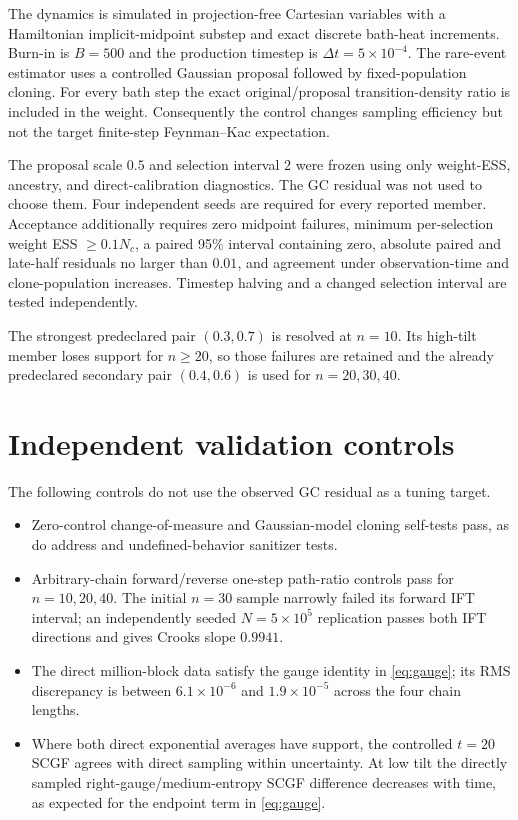\documentclass[11pt]{article}
\begin{document}
The dynamics is simulated in projection-free Cartesian variables with a
Hamiltonian implicit-midpoint substep and exact discrete bath-heat increments.
Burn-in is $B=500$ and the production timestep is $\Delta t=5\times10^{-4}$.
The rare-event estimator uses a controlled Gaussian proposal followed by
fixed-population cloning.  For every bath step the exact original/proposal
transition-density ratio is included in the weight.  Consequently the control
changes sampling efficiency but not the target finite-step Feynman--Kac
expectation.

The proposal scale $0.5$ and selection interval $2$ were frozen using only
weight-ESS, ancestry, and direct-calibration diagnostics.  The GC residual was
not used to choose them.  Four independent seeds are required for every
reported member.  Acceptance additionally requires zero midpoint failures,
minimum per-selection weight ESS $\ge0.1N_c$, a paired 95\% interval containing
zero, absolute paired and late-half residuals no larger than $0.01$, and
agreement under observation-time and clone-population increases.  Timestep
halving and a changed selection interval are tested independently.

The strongest predeclared pair $(0.3,0.7)$ is resolved at $n=10$.  Its
high-tilt member loses support for $n\ge20$, so those failures are retained and
the already predeclared secondary pair $(0.4,0.6)$ is used for
$n=20,30,40$.

\section{Independent validation controls}

The following controls do not use the observed GC residual as a tuning target.
\begin{itemize}
  \item Zero-control change-of-measure and Gaussian-model cloning self-tests
  pass, as do address and undefined-behavior sanitizer tests.
  \item Arbitrary-chain forward/reverse one-step path-ratio controls pass for
  $n=10,20,40$.  The initial $n=30$ sample narrowly failed its forward IFT
  interval; an independently seeded $N=5\times10^5$ replication passes both
  IFT directions and gives Crooks slope $0.9941$.
  \item The direct million-block data satisfy the gauge identity in
  \eqref{eq:gauge}; its RMS discrepancy is between $6.1\times10^{-6}$ and
  $1.9\times10^{-5}$ across the four chain lengths.
  \item Where both direct exponential averages have support, the controlled
  $t=20$ SCGF agrees with direct sampling within uncertainty.  At low tilt the
  directly sampled right-gauge/medium-entropy SCGF difference decreases with
  time, as expected for the endpoint term in \eqref{eq:gauge}.
\end{itemize}
\end{document}
